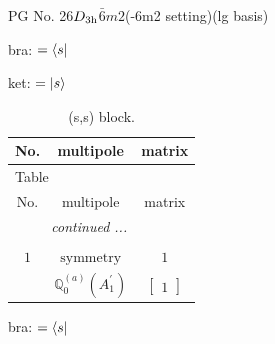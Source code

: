 \documentclass[fleqn,8pt,landscape]{jsarticle}
\begin{document}
\setcounter{MaxMatrixCols}{32}

\renewcommand{\tablename}{Table~}
\renewcommand{\figurename}{Figure~}
\begin{center}
\LARGE
PG No. 26\quad$D_{\rm 3h}$\quad$\bar{6}m2$\quad(-6m2 setting)\quad[ hexagonal ] (lg basis)
\end{center}
bra: $=\bra{s}$

\noindent
ket: $=\ket{s}$
\renewcommand{\arraystretch}{1.6}
\begin{longtable}{ccc}
\caption{(s,s) block.}
 \\
 \hline \hline
No. & multipole & matrix \\ \hline \endfirsthead

\multicolumn{2}{l}{\tablename\ \thetable{}} \\
 \hline \hline
No. & multipole & matrix \\ \hline \endhead

 \hline \hline
\multicolumn{2}{r}{\footnotesize\it continued ...} \\ \endfoot

 \hline \hline
\multicolumn{2}{r}{} \\ \endlastfoot

$ 1 $ & $ \text{symmetry} $ & $ 1 $ \\
$  $ & $ \mathbb{Q}_{0}^{(a)}(A_{1}^{\prime}) $ & $ \begin{bmatrix} 1 \end{bmatrix} $ \\ \hline
\end{longtable}
bra: $=\bra{s}$
\end{document}
